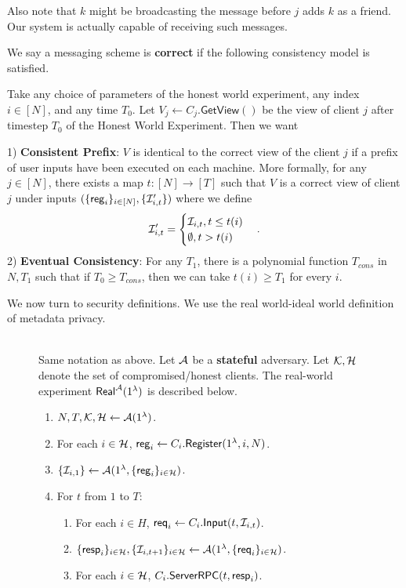 Also note that $k$ might be broadcasting the message before $j$ adds $k$ as a friend. Our system is actually capable of receiving such messages.
\begin{definition}[Correctness]
\label{defn:correctness}
 We say a messaging scheme is \textbf{correct} if the following consistency model is satisfied. 
 
 Take any choice of parameters of the honest world experiment, any index $i \in [N]$, and any time $T_0$. Let $V_j \leftarrow C_j.\mathsf{GetView}()$ be the view of client $j$ after timestep $T_0$ of the Honest World Experiment. Then we want

1) \textbf{Consistent Prefix}: $V$ is identical to the correct view of the client $j$ if a prefix of user inputs have been executed on each machine. More formally, for any $j \in [N]$, there exists a map $t: [N] \to [T]$ such that  $V$ is a correct view of client $j$ under inputs $(\{\mathsf{reg}_i\}_{i \in [N]}, \{\mathcal{I}'_{i, t}\})$
where we define
$$\mathcal{I}'_{i, t} = \begin{cases}
\mathcal{I}_{i, t}, t \leq t(i) \\
\emptyset, t > t(i)
\end{cases}.$$
2) \textbf{Eventual Consistency}: For any $T_1$, there is a polynomial function $T_{cons}$ in $N, T_1$ such that if $T_0 \geq T_{cons}$, then we can take $t(i) \geq T_1$ for every $i$.
\end{definition}
We now turn to security definitions. We use the real world-ideal world definition of metadata privacy.
\begin{figure}[h!]
\begin{framed}
\begin{definition} \hfill\\
\label{defn:real-world}
Same notation as above. Let $\mathcal{A}$ be a \textbf{stateful} adversary. Let $\mathcal{K}, \mathcal{H}$ denote the set of compromised/honest clients. The real-world experiment $\mathsf{Real}^{\mathcal{A}}(1^{\lambda})$ is described below.
\begin{enumerate}
\item $N, T, \mathcal{K}, \mathcal{H} \leftarrow \mathcal{A}(1^{\lambda})$.
\item For each $i \in \mathcal{H}$, $\mathsf{reg}_i \leftarrow C_i.\mathsf{Register}(1^{\lambda}, i, N)$. 
\item $\{\mathcal{I}_{i, 1}\} \leftarrow \mathcal{A}(1^{\lambda}, \{\mathsf{reg}_i\}_{i \in \mathcal{H}})$.
\item For $t$ from $1$ to $T$:
    \begin{enumerate}
    \item For each $i \in H$, $\mathsf{req}_i \leftarrow C_i.\mathsf{Input}(t, \mathcal{I}_{i, t})$.
    
    \item $\{\mathsf{resp}_i\}_{i \in \mathcal{H}}, \{\mathcal{I}_{i, t + 1}\}_{i \in \mathcal{H}} \leftarrow \mathcal{A}(1^{\lambda}, \{\mathsf{req}_i\}_{i \in \mathcal{H}})$.
    
    \item For each $i \in \mathcal{H}$, $C_i.\mathsf{ServerRPC}(t, \mathsf{resp}_i)$.
    \end{enumerate}
\end{enumerate}
\end{definition}
\end{framed}
\end{figure}

